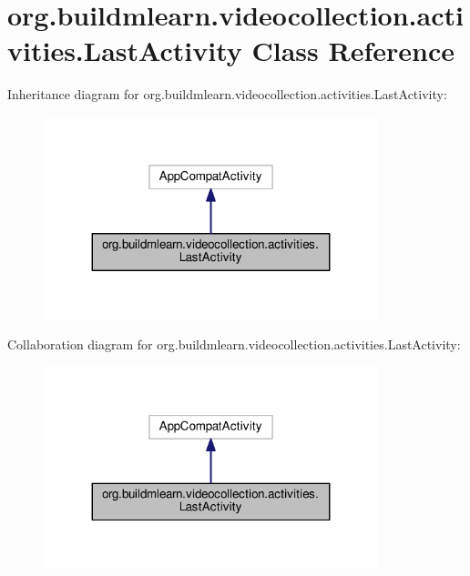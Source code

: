 \hypertarget{classorg_1_1buildmlearn_1_1videocollection_1_1activities_1_1LastActivity}{}\section{org.\+buildmlearn.\+videocollection.\+activities.\+Last\+Activity Class Reference}
\label{classorg_1_1buildmlearn_1_1videocollection_1_1activities_1_1LastActivity}


Inheritance diagram for org.\+buildmlearn.\+videocollection.\+activities.\+Last\+Activity\+:
\nopagebreak
\begin{figure}[H]
\begin{center}
\leavevmode
\includegraphics[width=275pt]{classorg_1_1buildmlearn_1_1videocollection_1_1activities_1_1LastActivity__inherit__graph}
\end{center}
\end{figure}


Collaboration diagram for org.\+buildmlearn.\+videocollection.\+activities.\+Last\+Activity\+:
\nopagebreak
\begin{figure}[H]
\begin{center}
\leavevmode
\includegraphics[width=275pt]{classorg_1_1buildmlearn_1_1videocollection_1_1activities_1_1LastActivity__coll__graph}
\end{center}
\end{figure}
